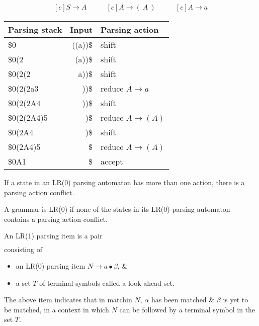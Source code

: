 \begin{equation*}
    \begin{aligned}[c]
        S \rightarrow A
    \end{aligned}
    \qquad 
    \begin{aligned}[c]
        A \rightarrow (\ A\ )
    \end{aligned}
    \qquad 
    \begin{aligned}[c]
        A \rightarrow a
    \end{aligned}
\end{equation*}
\begin{center}
    \begin{tabular}{|lr|l|}
        \hline
        Parsing stack \hspace{0.5cm} & Input & Parsing action \\
        \hline
        \$0 & ((a))\$ & shift \\
        \$0(2 & (a))\$ & shift \\
        \$0(2(2 & a))\$ & shift \\
        \$0(2(2a3 & ))\$ & reduce $A \rightarrow a$ \\
        \$0(2(2A4 & ))\$ & shift \\
        \$0(2(2A4)5 & )\$ & reduce \( A \rightarrow (A)\) \\
        \$0(2A4 & )\$ & shift \\
        \$0(2A4)5 & \$ & reduce \( A \rightarrow (A)\) \\
        \$0A1 & \$ & accept \\
        \hline
    \end{tabular}
\end{center}


If a state in an LR(0) parsing automaton has more than one action, 
there is a parsing action conflict.

A grammar is LR(0) if none of the states in its LR(0) parsing 
automaton contains a parsing action conflict.

An LR(1) parsing item is a pair
\begin{align*}
    [N \rightarrow \alpha \bullet \beta, T]
\end{align*}
consisting of
\begin{itemize}
    \item an LR(0) parsing item $N \rightarrow a \bullet \beta$, \&
    \item a set $T$ of terminal symbols called a look-ahead set.
\end{itemize}
The above item indicates that in matchin $N$, $\alpha$ has been matched \& $\beta$ is yet 
to be matched, in a context in which $N$ can be followed by a terminal symbol in the set $T$.

